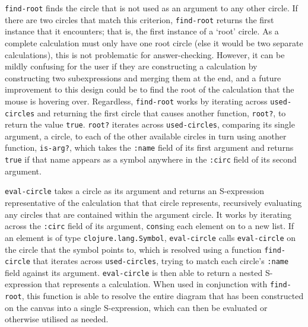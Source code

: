 \documentclass[12pt,twoside,notitlepage,xetex]{report}
\begin{document}
\verb¬find-root¬ finds the circle that is not used as an argument to any other
circle.  If there are two circles that match this criterion, \verb¬find-root¬
returns the first instance that it encounters; that is, the first instance of
a `root' circle.  As a complete calculation must only have one root circle
(else it would be two separate calculations), this is not problematic for
answer-checking.  However, it can be mildly confusing for the user if they are
constructing a calculation by constructing two subexpressions and merging them
at the end, and a future improvement to this design could be to find the root
of the calculation that the mouse is hovering over.  Regardless,
\verb¬find-root¬ works by iterating across \verb¬used-circles¬ and returning
the first circle that causes another function, \verb¬root?¬, to return the
value \verb¬true¬.  \verb¬root?¬ iterates across \verb¬used-circles¬, comparing
its single argument, a circle, to each of the other available circles in turn
using another function, \verb¬is-arg?¬, which takes the \verb¬:name¬ field of
its first argument and returns \verb¬true¬ if that name appears as a symbol
anywhere in the \verb¬:circ¬ field of its second argument.

\verb¬eval-circle¬ takes a circle as its argument and returns an S-expression
representative of the calculation that that circle represents, recursively
evaluating any circles that are contained within the argument circle.  It works
by iterating across the \verb¬:circ¬ field of its argument, \verb¬cons¬ing each
element on to a new list.  If an element is of type \verb¬clojure.lang.Symbol¬,
\verb¬eval-circle¬ calls \verb¬eval-circle¬ on the circle that the symbol
points to, which is resolved using a function \verb¬find-circle¬ that iterates
across \verb¬used-circles¬, trying to match each circle's \verb¬:name¬ field
against its argument.  \verb¬eval-circle¬ is then able to return a nested
S-expression that represents a calculation.  When used in conjunction with
\verb¬find-root¬, this function is able to resolve the entire diagram that has
been constructed on the canvas into a single S-expression, which can then be
evaluated or otherwise utilised as needed.
\end{document}
